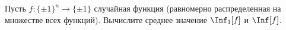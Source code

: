 Пусть $f\colon \{\pm 1\}^n \to \{\pm 1\}$ случайная функция (равномерно распределенная на множестве всех
функций). Вычислите среднее значение $\Inf_1[f]$ и $\Inf[f]$.